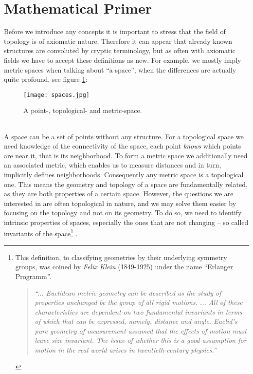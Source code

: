 \newpage
\section{Mathematical Primer}
\label{math1}

Before we introduce any concepts it is important to stress that the field of topology is of axiomatic nature.
Therefore it can appear that already known structures are convoluted by cryptic terminology, but as often with axiomatic fields we have to accept these definitions as new.
For example, we mostly imply metric spaces when talking about ``a space'', when the differences are actually quite profound, see figure \ref{fig:spaces}:
\begin{figure}[ht]
\centering
\texttt{[image: spaces.jpg]}
\caption{A point-, topological- and metric-space.}
\label{fig:spaces}
\end{figure}\\
A space can be a set of points without any structure.
For a topological space we need knowledge of the connectivity of the space, each point \textit{knows} which points are near it, that is its neighborhood.
To form a metric space we additionally need an associated metric, which enables us to measure distances and in turn, implicitly
defines neighborhoods.
Consequently any metric space is a topological one.
This means the geometry and topology of a space are fundamentally related, as they are both properties of a certain space.
However, the questions we are interested in are often topological in nature, and we may solve them easier by focusing on the topology and not on its geometry.
To do so, we need to identify intrinsic properties of spaces, especially the ones that are not changing -- so called invariants of the space\footnote{ This definition, to classifying geometries by their underlying symmetry groups, was coined by \textit{Felix Klein} (1849-1925) under the name ``Erlanger Programm''.
\begin{quote} \textit{``... Euclidean metric geometry can be described as the study of properties unchanged be the group of all rigid motions. ... All of these characteristics are dependent on two fundamental invariants in terms of which that can be expressed, namely, distance and angle. Euclid's pure geometry of measurement assumed that the effects of motion must leave size invariant. The issue of whether this is a good assumption for motion in the real world arises in twentieth-century physics.''} \citep[p.405]{Kramer1982} \end{quote}
} \citep[][cf. pp.1-5]{Zomorodian1996}.


